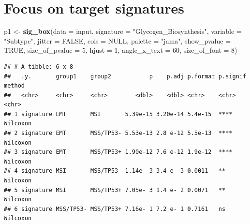 \documentclass[
  12pt,
]{book}
\newenvironment{Shaded}{\begin{snugshade}}{\end{snugshade}}
\newcommand{\AttributeTok}[1]{\textcolor[rgb]{0.13,0.29,0.53}{#1}}
\newcommand{\ConstantTok}[1]{\textcolor[rgb]{0.56,0.35,0.01}{#1}}
\newcommand{\DecValTok}[1]{\textcolor[rgb]{0.00,0.00,0.81}{#1}}
\newcommand{\FunctionTok}[1]{\textcolor[rgb]{0.13,0.29,0.53}{\textbf{#1}}}
\newcommand{\NormalTok}[1]{#1}
\newcommand{\OtherTok}[1]{\textcolor[rgb]{0.56,0.35,0.01}{#1}}
\newcommand{\StringTok}[1]{\textcolor[rgb]{0.31,0.60,0.02}{#1}}
\theoremstyle{definition}
\theoremstyle{definition}
\theoremstyle{definition}
\theoremstyle{definition}
\theoremstyle{remark}
\begin{document}
\hypertarget{focus-on-target-signatures}{%
\section{Focus on target signatures}\label{focus-on-target-signatures}}

\begin{Shaded}
\begin{Highlighting}[]
\NormalTok{p1 }\OtherTok{\textless{}{-}} \FunctionTok{sig\_box}\NormalTok{(}\AttributeTok{data           =}\NormalTok{ input, }
              \AttributeTok{signature      =} \StringTok{"Glycogen\_Biosynthesis"}\NormalTok{,}
              \AttributeTok{variable       =} \StringTok{"Subtype"}\NormalTok{,}
              \AttributeTok{jitter         =} \ConstantTok{FALSE}\NormalTok{,}
              \AttributeTok{cols           =}  \ConstantTok{NULL}\NormalTok{,}
              \AttributeTok{palette        =} \StringTok{"jama"}\NormalTok{,}
              \AttributeTok{show\_pvalue    =} \ConstantTok{TRUE}\NormalTok{,}
              \AttributeTok{size\_of\_pvalue =} \DecValTok{5}\NormalTok{,}
              \AttributeTok{hjust          =} \DecValTok{1}\NormalTok{, }
              \AttributeTok{angle\_x\_text   =} \DecValTok{60}\NormalTok{, }
              \AttributeTok{size\_of\_font   =} \DecValTok{8}\NormalTok{)}
\end{Highlighting}
\end{Shaded}

\begin{verbatim}
## # A tibble: 6 x 8
##   .y.       group1    group2           p    p.adj p.format p.signif method  
##   <chr>     <chr>     <chr>        <dbl>    <dbl> <chr>    <chr>    <chr>   
## 1 signature EMT       MSI       5.39e-15 3.20e-14 5.4e-15  ****     Wilcoxon
## 2 signature EMT       MSS/TP53- 5.53e-13 2.8 e-12 5.5e-13  ****     Wilcoxon
## 3 signature EMT       MSS/TP53+ 1.90e-12 7.6 e-12 1.9e-12  ****     Wilcoxon
## 4 signature MSI       MSS/TP53- 1.14e- 3 3.4 e- 3 0.0011   **       Wilcoxon
## 5 signature MSI       MSS/TP53+ 7.05e- 3 1.4 e- 2 0.0071   **       Wilcoxon
## 6 signature MSS/TP53- MSS/TP53+ 7.16e- 1 7.2 e- 1 0.7161   ns       Wilcoxon
\end{verbatim}
\end{document}
